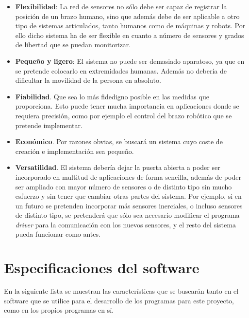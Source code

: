 \documentclass[12pt, a4paper]{report}
\begin{document}
\begin{itemize}

\item \textbf{Flexibilidad}: La red de sensores no sólo debe ser capaz de registrar la posición de un brazo humano, sino que además debe de ser aplicable a otro tipo de sistemas articulados, tanto humanos como de máquinas y robots. Por ello dicho sistema ha de ser flexible en cuanto a número de sensores y grados de libertad que se puedan monitorizar.

\item \textbf{Pequeño y ligero}: El sistema no puede ser demasiado aparatoso, ya que en se pretende colocarlo en extremidades humanas. Además no debería de dificultar la movilidad de la persona en absoluto.

\item \textbf{Fiabilidad}. Que sea lo más fidedigno posible en las medidas que proporciona. Esto puede tener mucha importancia en aplicaciones donde se requiera precisión, como por ejemplo el control del brazo robótico que se pretende implementar.

\item \textbf{Económico}. Por razones obvias, se buscará un sistema cuyo coste de creación e implementación sea pequeño.

\item \textbf{Versatilidad}. El sistema debería dejar la puerta abierta a poder ser incorporado en multitud de aplicaciones de forma sencilla, además de poder ser ampliado con mayor número de sensores o de distinto tipo sin mucho esfuerzo y sin tener que cambiar otras partes del sistema. Por ejemplo, si en un futuro se pretenden incorporar más sensores inerciales, o incluso sensores de distinto tipo, se pretenderá que sólo sea necesario modificar el programa \textit{driver} para la comunicación con los nuevos sensores, y el resto del sistema pueda funcionar como antes.  

\end{itemize}

\section{Especificaciones del software}

En la siguiente lista se muestran las características que se buscarán tanto en el software que se utilice para el desarrollo de los programas para este proyecto, como en los propios programas en sí.
\end{document}
